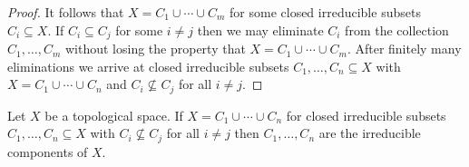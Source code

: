 \begin{proof}
  It follows that $X = C_1 \cup \dotsb \cup C_m$ for some closed irreducible subsets $C_i \subseteq X$.
  If $C_i \subseteq C_j$ for some $i \neq j$ then we may eliminate $C_i$ from the collection $C_1, \dotsc, C_m$ without losing the property that $X = C_1 \cup \dotsb \cup C_m$.
  After finitely many eliminations we arrive at closed irreducible subsets $C_1, \dotsc, C_n \subseteq X$ with $X = C_1 \cup \dotsb \cup C_n$ and $C_i \nsubseteq C_j$ for all $i \neq j$.
%   
%   
\end{proof}


\begin{lemma}
  \label{lemma: recognizing irreducible components}
  Let $X$ be a topological space.
  If $X = C_1 \cup \dotsb \cup C_n$ for closed irreducible subsets $C_1, \dotsc, C_n \subseteq X$ with $C_i \nsubseteq C_j$ for all $i \neq j$ then $C_1, \dotsc, C_n$ are the irreducible components of $X$.
\end{lemma}


